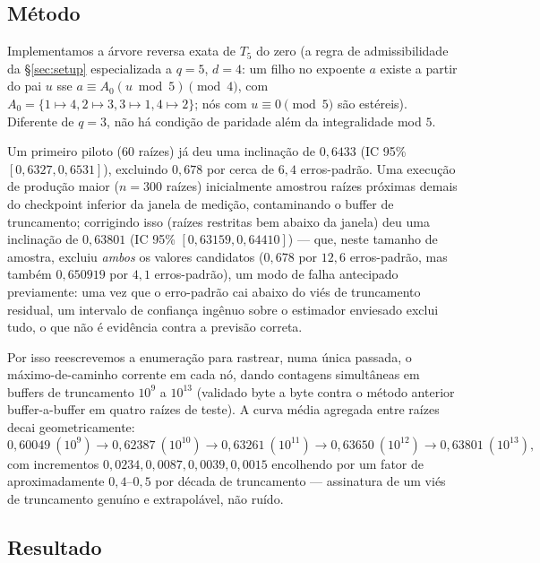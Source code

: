 \documentclass[11pt]{article}
\theoremstyle{definition}
\theoremstyle{remark}
\begin{document}
\subsection{Método}

Implementamos a árvore reversa exata de $T_5$ do zero (a regra de
admissibilidade da \S\ref{sec:setup} especializada a $q=5$, $d=4$: um
filho no expoente $a$ existe a partir do pai $u$ sse $a\equiv
A_0(u\bmod 5)\pmod 4$, com $A_0=\{1\!\mapsto\!4,\allowbreak
2\!\mapsto\!3,\allowbreak 3\!\mapsto\!1,\allowbreak 4\!\mapsto\!2\}$;
nós com $u\equiv 0\pmod 5$ são estéreis). Diferente de $q=3$, não há
condição de paridade além da integralidade mod $5$.

Um primeiro piloto ($60$ raízes) já deu uma inclinação de $0{,}6433$
(IC 95\% $[0{,}6327,0{,}6531]$), excluindo $0{,}678$ por cerca de
$6{,}4$ erros-padrão. Uma execução de produção maior ($n=300$ raízes)
inicialmente amostrou raízes próximas demais do checkpoint inferior da
janela de medição, contaminando o buffer de truncamento; corrigindo
isso (raízes restritas bem abaixo da janela) deu uma inclinação de
$0{,}63801$ (IC 95\% $[0{,}63159, 0{,}64410]$) --- que, neste tamanho
de amostra, excluiu \emph{ambos} os valores candidatos ($0{,}678$ por
$12{,}6$ erros-padrão, mas também $0{,}650919$ por $4{,}1$
erros-padrão), um modo de falha antecipado previamente: uma vez que o
erro-padrão cai abaixo do viés de truncamento residual, um intervalo de
confiança ingênuo sobre o estimador enviesado exclui tudo, o que não é
evidência contra a previsão correta.

Por isso reescrevemos a enumeração para rastrear, numa única passada,
o máximo-de-caminho corrente em cada nó, dando contagens simultâneas
em buffers de truncamento $10^9$ a $10^{13}$ (validado byte a byte
contra o método anterior buffer-a-buffer em quatro raízes de teste). A
curva média agregada entre raízes decai geometricamente:
\[
  0{,}60049\ (10^9) \to 0{,}62387\ (10^{10}) \to 0{,}63261\ (10^{11}) \to
  0{,}63650\ (10^{12}) \to 0{,}63801\ (10^{13}),
\]
com incrementos $0{,}0234, 0{,}0087, 0{,}0039, 0{,}0015$ encolhendo por
um fator de aproximadamente $0{,}4$--$0{,}5$ por década de truncamento
--- assinatura de um viés de truncamento genuíno e extrapolável, não
ruído.

\subsection{Resultado}
\end{document}
